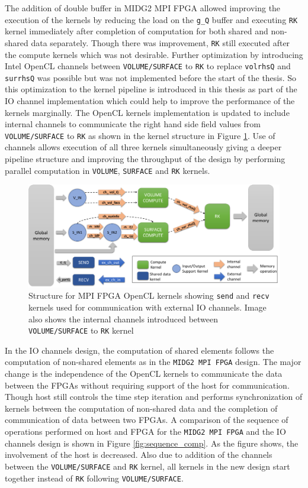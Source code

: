 The addition of double buffer in MIDG2 \ac{MPI} FPGA allowed improving the execution of the kernels
by reducing the load on the \texttt{g\_Q} buffer and executing \texttt{RK} kernel immediately after completion
of computation for both shared and non-shared data separately. Though there was improvement,
\texttt{RK} still executed after the compute kernels which was not desirable. Further optimization
by introducing Intel OpenCL channels between \texttt{VOLUME/SURFACE} to \texttt{RK} to replace
\texttt{volrhsQ} and \texttt{surrhsQ} was possible but was not implemented before the start of the thesis.
So this optimization to the kernel pipeline is introduced in this thesis as part of the IO channel implementation
which could help to improve the performance of the kernels marginally.
The OpenCL kernels implementation is updated to include internal channels to
communicate the right hand side field values
from \texttt{VOLUME/SURFACE} to \texttt{RK} as shown in the kernel structure
in Figure \ref{fig:iochan_kernstruc}. Use of channels allows execution of all three
kernels simultaneously giving a deeper pipeline structure and improving the throughput
of the design by performing parallel computation in \texttt{VOLUME}, \texttt{SURFACE} and \texttt{RK} kernels.

\begin{figure}[ht]%
    \centering
    \includegraphics[width=1.0\textwidth]{images/iochan_kernstruc}
    \caption{Structure for \ac{MPI} FPGA OpenCL kernels showing \texttt{send} and \texttt{recv}
    kernels used for communication with external IO channels. Image also shows the internal
    channels introduced between \texttt{VOLUME/SURFACE} to \texttt{RK} kernel}
    \label{fig:iochan_kernstruc}
\end{figure}

In the IO channels design, the computation of shared elements follows the computation of
non-shared elements as in the \texttt{MIDG2 MPI FPGA} design. The major change is the independence of the OpenCL kernels to
communicate the data between the FPGAs without requiring support of the host for
communication. Though host still controls the time step iteration and performs synchronization of kernels between
the computation of non-shared data and the completion of communication of data between two FPGAs.
A comparison of the sequence of operations performed on host and FPGA for the \texttt{MIDG2 MPI FPGA} and
the IO channels design is shown in Figure \ref{fig:sequence_comp}. As the figure shows,
the involvement of the host is decreased. Also due to addition of the channels between
the \texttt{VOLUME/SURFACE} and \texttt{RK} kernel, all kernels in the new design start together instead
of \texttt{RK} following \texttt{VOLUME/SURFACE}.

